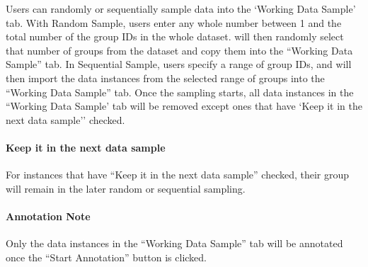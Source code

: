 



Users can randomly or sequentially sample data into the `Working Data Sample' tab. With Random Sample, users enter any whole number between 1 and the total number of the group IDs in the whole dataset. \system will then randomly select that number of groups from the dataset and copy them into the ``Working Data Sample'' tab. 
In Sequential Sample, users specify a range of group IDs, and \system will then import the data instances from the selected range of groups into the ``Working Data Sample'' tab.
Once the sampling starts, all data instances in the ``Working Data Sample' tab will be removed except ones that have `Keep it in the next data sample'' checked. 

\paragraph{Keep it in the next data sample} For instances that have ``Keep it in the next data sample'' checked, their group will remain in the later random or sequential sampling.

\paragraph{Annotation Note} Only the data instances in the ``Working Data Sample'' tab will be annotated once the ``Start Annotation'' button is clicked.
